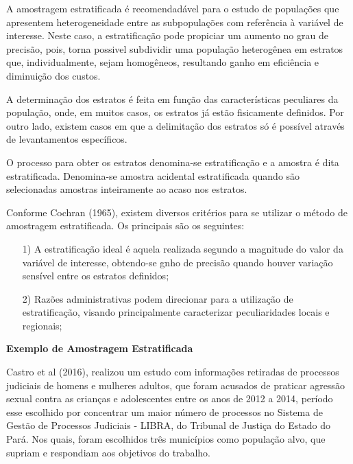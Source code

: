 
A amostragem estratificada é recomendadável para o estudo de
populações que apresentem heterogeneidade entre as subpopulações
com referência à variável de interesse. Neste caso, a
estratificação pode propiciar um aumento no grau de precisão,
pois, torna possivel subdividir uma população heterogênea em
estratos que, individualmente, sejam homogêneos, resultando ganho
em eficiência e diminuição dos custos.\vskip0.3cm


A determinação dos estratos é feita em função das características
peculiares da população, onde, em muitos casos, os estratos já
estão fisicamente definidos. Por outro lado, existem casos em que
a delimitação dos estratos só é possível através de levantamentos
específicos.\vskip0.3cm


O processo para obter os estratos denomina-se estratificação e a
amostra é dita estratificada. Denomina-se amostra acidental
estratificada quando são selecionadas amostras inteiramente ao
acaso nos estratos.\vskip0.3cm

Conforme Cochran (1965), existem diversos critérios para se
utilizar o método de amostragem estratificada. Os principais são
os seguintes:


\begin{enumerate}
  \item[{1)}] A estratificação ideal é aquela realizada segundo a magnitude do valor da variável de interesse,
  obtendo-se gnho de precisão quando houver variação sensível entre os estratos definidos;
  \item[{2)}] Razões administrativas podem direcionar para a utilização de estratificação, visando
  principalmente caracterizar peculiaridades locais e regionais;
\end{enumerate}


\textbf{Exemplo de Amostragem Estratificada}
\vskip0.3cm

Castro et al (2016), realizou um estudo com informações retiradas de processos
judiciais de homens e mulheres adultos, que foram acusados de praticar agressão
sexual contra as crianças e adolescentes entre os anos de 2012 a 2014, período esse
escolhido por concentrar um maior número de processos no Sistema de Gestão de
Processos Judiciais - LIBRA, do Tribunal de Justiça do Estado do Pará. Nos quais,
foram escolhidos três municípios como população alvo, que supriam e respondiam aos objetivos do trabalho.

